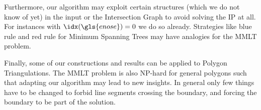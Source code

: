 Furthermore, our algorithm may exploit certain structures (which we
do not know of yet) in the input or the Intersection Graph to avoid
solving the \gls{IP} at all. For instances with \(\idx(\gls{enose}) = 0\)
we do so already. Strategies like blue rule and red rule for
Minimum Spanning Trees may have analogies for the \gls{MMLT} problem.

Finally, some of our constructions and results can be applied to
Polygon Triangulations. The \gls{MMLT} problem is also NP-hard for
general polygons such that adapting our algorithm may lead to new
insights. In general only few things have to be changed to forbid
line segments crossing the boundary, and forcing the boundary to
be part of the solution.
